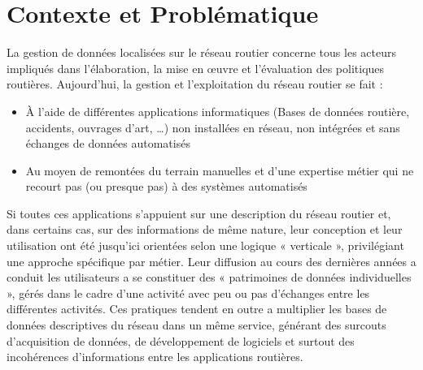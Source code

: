 \chapter{Contexte et Problématique}

\ifpdf
    \graphicspath{{Chapter3/Figs/Raster/}{Chapter3/Figs/PDF/}{Chapter3/Figs/}}
\else
    \graphicspath{{Chapter3/Figs/Vector/}{Chapter3/Figs/}}
\fi

La gestion de données localisées sur le réseau routier concerne tous les acteurs impliqués dans l’élaboration, la mise en œuvre et l’évaluation des politiques routières. Aujourd’hui, la gestion et l’exploitation du réseau routier se fait :
\begin{itemize}
\item À l'aide de différentes applications informatiques (Bases de données routière, accidents, ouvrages d'art, …) non installées en réseau, non intégrées et sans échanges de données automatisés
\item Au moyen de remontées du terrain manuelles et d'une expertise métier qui ne recourt pas (ou presque pas) à des systèmes automatisés
\end{itemize}
Si toutes ces applications s’appuient sur une description du réseau routier et, dans certains cas, sur des informations de même nature, leur conception et leur utilisation ont été jusqu’ici orientées selon une logique « verticale », privilégiant une approche spécifique par métier.
Leur diffusion au cours des dernières années a conduit les utilisateurs a se constituer des « patrimoines de données individuelles », gérés dans le cadre d’une activité avec peu ou pas d’échanges entre les différentes activités. Ces pratiques tendent en outre a multiplier les bases de données descriptives du réseau dans un même service, générant des surcouts d’acquisition de données, de développement de logiciels et surtout des incohérences d’informations entre les applications routières.